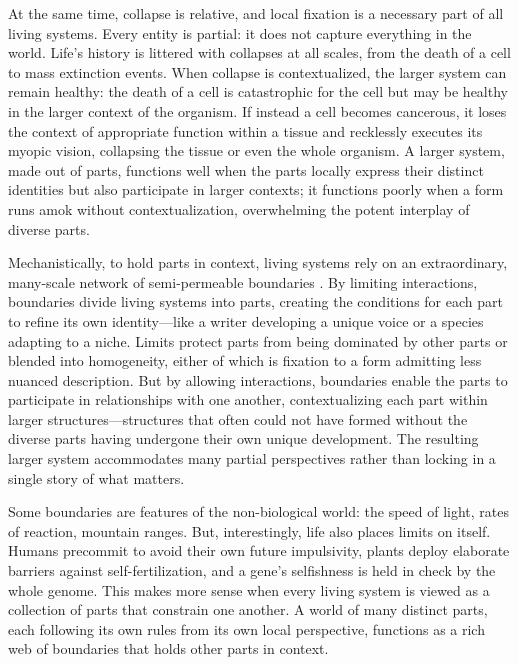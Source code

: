 \documentclass[11pt]{article}
\begin{document}
At the same time, collapse is relative, and local fixation is a necessary part of all living systems. Every entity is partial: it does not capture everything in the world. Life's history is littered with collapses at all scales, from the death of a cell to mass extinction events. When collapse is contextualized, the larger system can remain healthy: the death of a cell is catastrophic for the cell but may be healthy in the larger context of the organism. If instead a cell becomes cancerous, it loses the context of appropriate function within a tissue and recklessly executes its myopic vision, collapsing the tissue or even the whole organism. A larger system, made out of parts, functions well when the parts locally express their distinct identities but also participate in larger contexts; it functions poorly when a form runs amok without contextualization, overwhelming the potent interplay of diverse parts.

Mechanistically, to hold parts in context, living systems rely on an extraordinary, many-scale network of semi-permeable boundaries \citep{maturana2012autopoiesis, simon1962architecture, moreno2015biological}. By limiting interactions, boundaries divide living systems into parts, creating the conditions for each part to refine its own identity---like a writer developing a unique voice or a species adapting to a niche. Limits protect parts from being dominated by other parts or blended into homogeneity, either of which is fixation to a form admitting less nuanced description. But by allowing interactions, boundaries enable the parts to participate in relationships with one another, contextualizing each part within larger structures---structures that often could not have formed without the diverse parts having undergone their own unique development. The resulting larger system accommodates many partial perspectives rather than locking in a single story of what matters.

Some boundaries are features of the non-biological world: the speed of light, rates of reaction, mountain ranges. But, interestingly, life also places limits on itself. Humans precommit to avoid their own future impulsivity, plants deploy elaborate barriers against self-fertilization, and a gene's selfishness is held in check by the whole genome. This makes more sense when every living system is viewed as a collection of parts that constrain one another. A world of many distinct parts, each following its own rules from its own local perspective, functions as a rich web of boundaries that holds other parts in context. 
\end{document}
